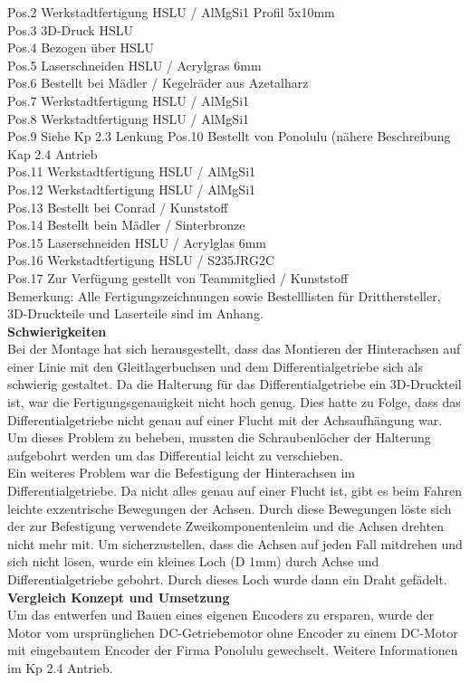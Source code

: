 Pos.2 	Werkstadtfertigung HSLU / AlMgSi1 Profil 5x10mm\\
Pos.3 	3D-Druck HSLU\\
Pos.4 	Bezogen über HSLU\\
Pos.5 	Laserschneiden HSLU / Acrylgras 6mm\\
Pos.6 	Bestellt bei Mädler / Kegelräder aus Azetalharz\\
Pos.7 	Werkstadtfertigung HSLU / AlMgSi1\\
Pos.8	Werkstadtfertigung HSLU / AlMgSi1\\
Pos.9 	Siehe Kp 2.3 Lenkung
Pos.10	Bestellt von Ponolulu (nähere Beschreibung Kap 2.4 Antrieb\\
Pos.11	Werkstadtfertigung HSLU / AlMgSi1\\
Pos.12	Werkstadtfertigung HSLU / AlMgSi1\\
Pos.13	Bestellt bei Conrad / Kunststoff\\
Pos.14	Bestellt bein Mädler / Sinterbronze\\
Pos.15	Laserschneiden HSLU / Acrylglas 6mm\\
Pos.16	Werkstadtfertigung HSLU / S235JRG2C\\
Pos.17	Zur Verfügung gestellt von Teammitglied / Kunststoff\\[0.2cm]
Bemerkung: Alle Fertigungszeichnungen sowie Bestelllisten für Dritthersteller, 3D-Druckteile und Laserteile sind im Anhang.\\
\textbf{Schwierigkeiten}\\[0.2cm]
Bei der Montage hat sich herausgestellt, dass das Montieren der Hinterachsen  auf einer Linie mit den Gleitlagerbuchsen und dem Differentialgetriebe sich als schwierig gestaltet. Da die Halterung für das Differentialgetriebe ein 3D-Druckteil ist, war die Fertigungsgenauigkeit nicht hoch genug. Dies hatte zu Folge, dass das Differentialgetriebe nicht genau auf einer Flucht mit der Achsaufhängung war. Um dieses Problem zu beheben, mussten die Schraubenlöcher der Halterung aufgebohrt werden um das Differential leicht zu verschieben.\\
Ein weiteres Problem war die Befestigung der Hinterachsen im Differentialgetriebe. Da nicht alles genau auf einer Flucht ist, gibt es beim Fahren leichte exzentrische Bewegungen der Achsen. Durch diese Bewegungen löste sich der zur Befestigung verwendete Zweikomponentenleim und die Achsen drehten nicht mehr mit. Um sicherzustellen, dass die Achsen auf jeden Fall mitdrehen und sich nicht lösen, wurde ein kleines Loch (D 1mm) durch Achse und Differentialgetriebe gebohrt. Durch dieses Loch wurde dann ein Draht gefädelt.\\[0.2cm] 
\textbf{Vergleich Konzept und Umsetzung}\\[0.2cm]
Um das entwerfen und Bauen eines eigenen Encoders zu ersparen, wurde der Motor vom ursprünglichen DC-Getriebemotor ohne Encoder zu einem DC-Motor mit eingebautem Encoder der Firma Ponolulu gewechselt. Weitere Informationen im Kp 2.4 Antrieb.
